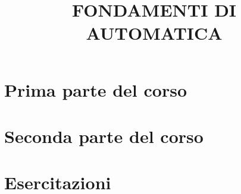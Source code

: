 \documentclass[a4paper, 9pt]{article}
\title{FONDAMENTI DI AUTOMATICA}
\begin{document}
    \maketitle
    \tableofcontents{}
    \newpage
    \part{Prima parte del corso}
    
    
    
    
    
    
    
    
    
    
    
    \newpage
    \part{Seconda parte del corso}
    
    
    
    
    
    
    
    
    
    
    
    
    
    
    
    
    
    
    
    
    
    
    \newpage
    \part{Esercitazioni}
    
    
    
    
    
    
    
\end{document}
